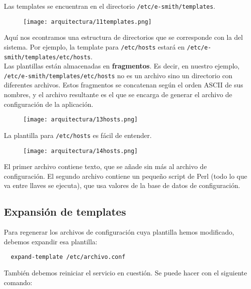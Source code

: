 Las templates se encuentran en el directorio \lstinline!/etc/e-smith/templates!.

\begin{figure}[H]
    \centering
    \texttt{[image: arquitectura/11templates.png]}
\end{figure}

Aquí nos econtramos una estructura de directorios que se corresponde con la del sistema. Por ejemplo, la template para \lstinline!/etc/hosts! estará en \lstinline!/etc/e-smith/templates/etc/hosts!.\\

Las plantillas están almacenadas en \textbf{fragmentos}. Es decir, en nuestro ejemplo, \lstinline!/etc/e-smith/templates/etc/hosts! no es un archivo sino un directorio con diferentes archivos. Estos fragmentos se concatenan según el orden ASCII de sus nombres, y el archivo resultante es el que se encarga de generar el archivo de configuración de la aplicación.

\begin{figure}[H]
    \centering
    \texttt{[image: arquitectura/13hosts.png]}
\end{figure}

La plantilla para \lstinline!/etc/hosts! es fácil de entender.

\begin{figure}[H]
    \centering
    \texttt{[image: arquitectura/14hosts.png]}
\end{figure}

El primer archivo contiene texto, que se añade sin más al archivo de configuración. El segundo archivo contiene un pequeño script de Perl (todo lo que va entre llaves se ejecuta), que usa valores de la base de datos de configuración.\\

\subsection{Expansión de templates}

Para regenerar los archivos de configuración cuya plantilla hemos modificado, debemos expandir esa plantilla:

\begin{lstlisting}
  expand-template /etc/archivo.conf
\end{lstlisting}

También debemos reiniciar el servicio en cuestión. Se puede hacer con el siguiente comando:


